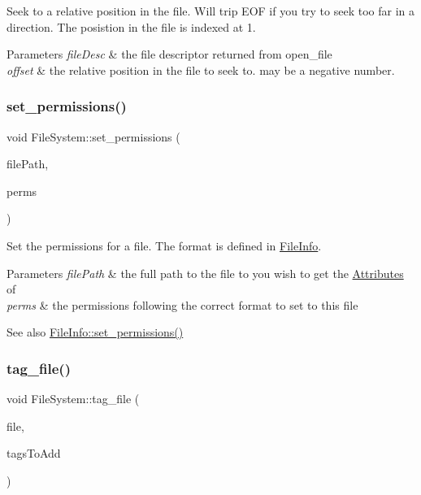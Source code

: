 Seek to a relative position in the file. Will trip E\+OF if you try to seek too far in a direction. The posistion in the file is indexed at 1. 
\begin{DoxyParams}{Parameters}
{\em file\+Desc} & the file descriptor returned from open\+\_\+file \\
\hline
{\em offset} & the relative position in the file to seek to. may be a negative number. \\
\hline
\end{DoxyParams}
\mbox{\label{class_file_system_abfa7e15fdbeaaaabfa3a542625c90b83}} 
\subsubsection{\texorpdfstring{set\+\_\+permissions()}{set\_permissions()}}
{\footnotesize\ttfamily void File\+System\+::set\+\_\+permissions (\begin{DoxyParamCaption}\item[{vector$<$ string $>$ \&}]{file\+Path,  }\item[{char $\ast$}]{perms }\end{DoxyParamCaption})}

Set the permissions for a file. The format is defined in \mbox{\hyperlink{class_file_info}{File\+Info}}. 
\begin{DoxyParams}{Parameters}
{\em file\+Path} & the full path to the file to you wish to get the \mbox{\hyperlink{class_attributes}{Attributes}} of \\
\hline
{\em perms} & the permissions following the correct format to set to this file \\
\hline
\end{DoxyParams}
\begin{DoxySeeAlso}{See also}
\mbox{\hyperlink{class_file_info_a377208012195dba0b24723837f6db39f}{File\+Info\+::set\+\_\+permissions()}} 
\end{DoxySeeAlso}
\mbox{\label{class_file_system_a33649a9100b30978db80654ece6504f4}} 
\subsubsection{\texorpdfstring{tag\+\_\+file()}{tag\_file()}\hspace{0.1cm}{\footnotesize\ttfamily [1/2]}}
{\footnotesize\ttfamily void File\+System\+::tag\+\_\+file (\begin{DoxyParamCaption}\item[{\mbox{\hyperlink{class_file_info}{File\+Info}} $\ast$}]{file,  }\item[{unordered\+\_\+set$<$ string $>$}]{tags\+To\+Add }\end{DoxyParamCaption})}

